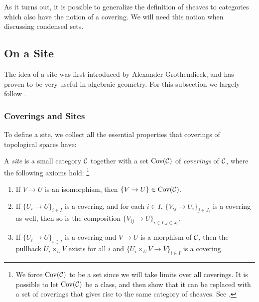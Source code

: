 \documentclass{article}
\DeclareMathOperator{\Cov}{Cov}
\begin{document}
As it turns out, it is possible to generalize
the definition of sheaves to categories which
also have the notion of a covering. We will
need this notion when discussing condensed sets.
\subsection{On a Site}

The idea of a site was first introduced by
Alexander Grothendieck, and has proven to be
very useful in algebraic geometry.
For this subsection we largely follow
\cite[\href{https://stacks.math.columbia.edu/tag/00UZ}{Tag 00UZ}]{stacks-project}.

\subsubsection{Coverings and Sites}

To define a site, we collect all the essential
properties that coverings of topological spaces have:
\begin{definition}
    A \emph{site} is a small category $\mathcal{C}$ together
    with a set $\Cov(\mcC)$ of \emph{coverings} of
    $\mathcal{C}$, where the following axioms hold:
    \footnote{We force $\Cov(\mcC)$ to be a set since we will take limits
        over all coverings. It is possible to let $\Cov(\mcC)$ be a class,
        and then show that it can be replaced with a set of coverings
        that gives rise to the same category of sheaves.
        See \cite[\href{https://stacks.math.columbia.edu/tag/00VI}{Tag 00VI}]{stacks-project}.}
    \begin{enumerate}
        \item If $V \to U$ is an isomorphism, then $\{V \to U\}\in \Cov(\mcC)$.
        \item If $\{U_i \to U\}_{i\in I}$ is a covering, and for each $i\in I$,
              $\{V_{ij} \to U_i\}_{j \in J_i}$ is a covering as well, then so is the
              composition $\{V_{ij} \to U\}_{i\in I, j\in J_i}$.
        \item If $\{U_i \to U\}_{i\in I}$ is a covering and $V \to U$ is a morphism
              of $\mathcal{C}$, then the pullback $U_i\times_U V$ exists for all $i$
              and $\{U_i\times_U V \to V\}_{i\in I}$ is a covering.
    \end{enumerate}
\end{definition}
\end{document}

